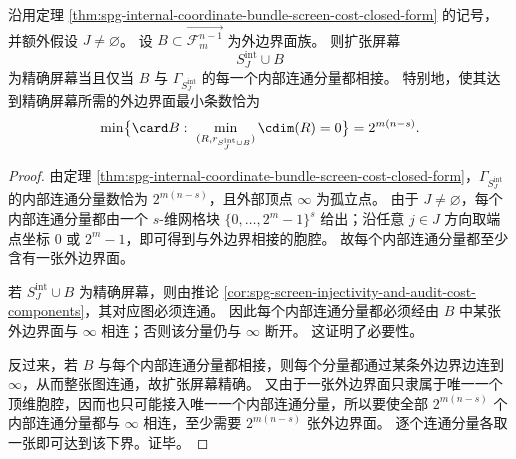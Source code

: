 \begin{corollary}[非空坐标束屏幕的最小外边界闭合条数]\label{cor:spg-coordinate-bundle-minimal-boundary-closure}
沿用定理 \ref{thm:spg-internal-coordinate-bundle-screen-cost-closed-form} 的记号，并额外假设 \(J\neq\varnothing\)。
设 \(B\subset \overrightarrow{\mathcal F_m^{n-1}}\) 为外边界面族。
则扩张屏幕
\[
S_J^{\mathrm{int}}\cup B
\]
为精确屏幕当且仅当 \(B\) 与 \(\Gamma_{S_J^{\mathrm{int}}}\) 的每一个内部连通分量都相接。
特别地，使其达到精确屏幕所需的外边界面最小条数恰为
\[
\min\bigl\{\card B:\ \min_{(R,r_{S_J^{\mathrm{int}}\cup B})}\cdim(R)=0\bigr\}
=
2^{m(n-s)}.
\]
\end{corollary}
\begin{proof}
由定理 \ref{thm:spg-internal-coordinate-bundle-screen-cost-closed-form}，\(\Gamma_{S_J^{\mathrm{int}}}\) 的内部连通分量数恰为 \(2^{m(n-s)}\)，且外部顶点 \(\infty\) 为孤立点。
由于 \(J\neq\varnothing\)，每个内部连通分量都由一个 \(s\)-维网格块
\(
\{0,\dots,2^m-1\}^s
\)
给出；沿任意 \(j\in J\) 方向取端点坐标 \(0\) 或 \(2^m-1\)，即可得到与外边界相接的胞腔。
故每个内部连通分量都至少含有一张外边界面。

若 \(S_J^{\mathrm{int}}\cup B\) 为精确屏幕，则由推论 \ref{cor:spg-screen-injectivity-and-audit-cost-components}，其对应图必须连通。
因此每个内部连通分量都必须经由 \(B\) 中某张外边界面与 \(\infty\) 相连；否则该分量仍与 \(\infty\) 断开。
这证明了必要性。

反过来，若 \(B\) 与每个内部连通分量都相接，则每个分量都通过某条外边界边连到 \(\infty\)，从而整张图连通，故扩张屏幕精确。
又由于一张外边界面只隶属于唯一一个顶维胞腔，因而也只可能接入唯一一个内部连通分量，所以要使全部 \(2^{m(n-s)}\) 个内部连通分量都与 \(\infty\) 相连，至少需要 \(2^{m(n-s)}\) 张外边界面。
逐个连通分量各取一张即可达到该下界。证毕。
\end{proof}

